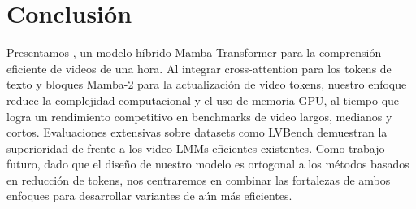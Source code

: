 \section{Conclusión}
Presentamos \model, un modelo híbrido Mamba-Transformer para la comprensión eficiente de videos de una hora. Al integrar cross-attention para los tokens de texto y bloques Mamba-2 para la actualización de video tokens, nuestro enfoque reduce la complejidad computacional y el uso de memoria GPU, al tiempo que logra un rendimiento competitivo en benchmarks de video largos, medianos y cortos. Evaluaciones extensivas sobre datasets como LVBench demuestran la superioridad de \model frente a los video LMMs eficientes existentes. Como trabajo futuro, dado que el diseño de nuestro modelo es ortogonal a los métodos basados en reducción de tokens, nos centraremos en combinar las fortalezas de ambos enfoques para desarrollar variantes de \model aún más eficientes.
